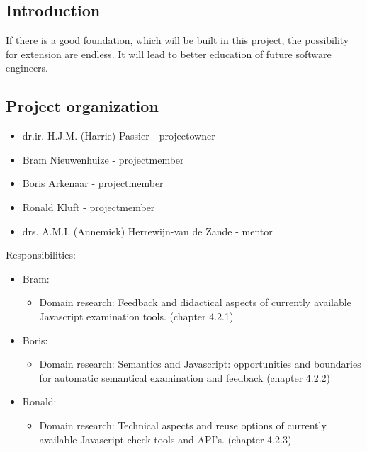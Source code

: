 \documentclass{article}
\begin{document}
\begin{itemize}
\subsection{Introduction}

If there is a good foundation, which will be built in this project, the possibility for extension are endless. It will lead to better education of future software engineers.  

\subsection{Project organization}

\begin{itemize}
  \item dr.ir. H.J.M. (Harrie) Passier - projectowner
  \item Bram Nieuwenhuize - projectmember
  \item Boris Arkenaar - projectmember
  \item Ronald Kluft - projectmember
  \item drs. A.M.I. (Annemiek) Herrewijn-van de Zande - mentor
\end{itemize}

Responsibilities:
\begin{itemize}
  \item Bram: 
	\begin{itemize}
	\item Domain research: Feedback and didactical aspects of currently available Javascript examination tools. (chapter 4.2.1)
	\end{itemize}
  \item Boris:
	\begin{itemize}
	\item Domain research: Semantics and Javascript: opportunities and boundaries for automatic semantical examination and feedback (chapter 4.2.2)
	\end{itemize}
  \item Ronald:
	\begin{itemize}
	\item Domain research: Technical aspects and reuse options of currently available Javascript check tools and API's. (chapter 4.2.3)
	\end{itemize}
\end{itemize}


\end{itemize}
\end{document}
